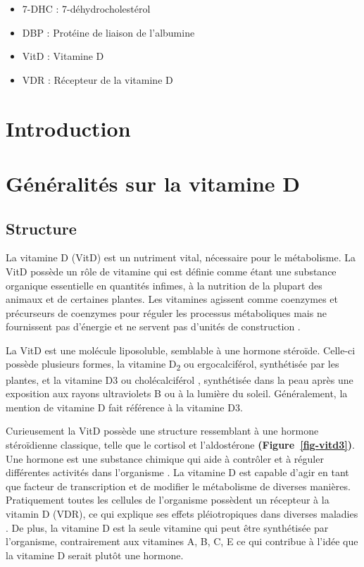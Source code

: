 \documentclass[
  letterpaper,
  DIV=11,
  numbers=noendperiod]{scrartcl}
\providecommand{\tightlist}{%
  \setlength{\itemsep}{0pt}\setlength{\parskip}{0pt}}\usepackage{longtable,booktabs,array}
\begin{document}
\begin{itemize}
\tightlist
\item
  7-DHC : 7-déhydrocholestérol
\item
  DBP : Protéine de liaison de l'albumine
\item
  VitD : Vitamine D
\item
  VDR : Récepteur de la vitamine D
\end{itemize}

\newpage{}

\hypertarget{introduction}{%
\section{Introduction}\label{introduction}}


\newpage{}

\hypertarget{guxe9nuxe9ralituxe9s-sur-la-vitamine-d}{%
\section{Généralités sur la vitamine
D}\label{guxe9nuxe9ralituxe9s-sur-la-vitamine-d}}

\hypertarget{structure}{%
\subsection{Structure}\label{structure}}

La vitamine D (VitD) est un nutriment vital, nécessaire pour le
métabolisme. La VitD possède un rôle de vitamine qui est définie comme
étant une substance organique essentielle en quantités infimes, à la
nutrition de la plupart des animaux et de certaines plantes. Les
vitamines agissent comme coenzymes et précurseurs de coenzymes pour
réguler les processus métaboliques mais ne fournissent pas d'énergie et
ne servent pas d'unités de construction \autocite{Ellison.2020}.

La VitD est une molécule liposoluble, semblable à une hormone stéroïde.
Celle-ci possède plusieurs formes, la vitamine D\textsubscript{2} ou
ergocalciférol, synthétisée par les plantes, et la vitamine D3 ou
cholécalciférol , synthétisée dans la peau après une exposition aux
rayons ultraviolets B ou à la lumière du soleil. Généralement, la
mention de vitamine D fait référence à la vitamine D3.

Curieusement la VitD possède une structure ressemblant à une hormone
stéroïdienne classique, telle que le cortisol et l'aldostérone
\autocite{Norman.2008} \textbf{(Figure~\ref{fig-vitd3})}. Une hormone
est une substance chimique qui aide à contrôler et à réguler différentes
activités dans l'organisme \autocite{Ellison.2020}. La vitamine D est
capable d'agir en tant que facteur de transcription et de modifier le
métabolisme de diverses manières. Pratiquement toutes les cellules de
l'organisme possèdent un récepteur à la vitamin D (VDR), ce qui explique
ses effets pléiotropiques dans diverses maladies
\autocite{Ellison.2020,Caprio.2017,Norman.2008}. De plus, la vitamine D
est la seule vitamine qui peut être synthétisée par l'organisme,
contrairement aux vitamines A, B, C, E ce qui contribue à l'idée que la
vitamine D serait plutôt une hormone.
\end{document}
